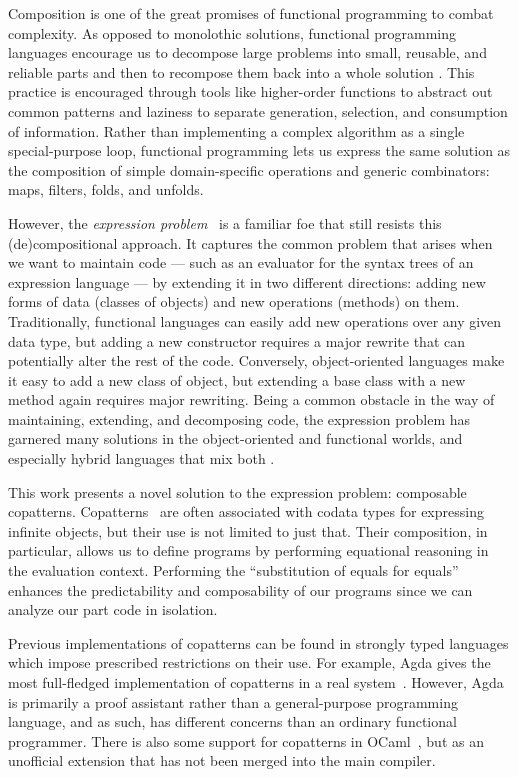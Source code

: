 
Composition is one of the great promises of functional programming to combat complexity.
As opposed to monolothic solutions, functional programming languages encourage us to decompose large problems into small, reusable, and reliable parts and then to recompose them back into a whole solution \cite{Hughes1989WFPM}.
This practice is encouraged through tools like higher-order functions to abstract out common patterns and laziness to separate generation, selection, and consumption of information.
Rather than implementing a complex algorithm as a single special-purpose loop, functional programming lets us express the same solution as the composition of simple domain-specific operations and generic combinators: maps, filters, folds, and unfolds.

However, the \emph{expression problem}~\cite{ExpressionProblem} is a familiar foe that still resists this (de)compositional approach.
It captures the common problem that arises when we want to maintain code --- such as an evaluator for the syntax trees of an expression language --- by extending it in two different directions: adding new forms of data (\ie classes of objects) and new operations (\ie methods) on them.
Traditionally, functional languages can easily add new operations over any given data type, but adding a new constructor requires a major rewrite that can potentially alter the rest of the code.
Conversely, object-oriented languages make it easy to add a new class of object, but extending a base class with a new method again requires major rewriting.
Being a common obstacle in the way of maintaining, extending, and decomposing code, the expression problem has garnered many solutions in the object-oriented \cite{GangOfFour,wehr_javagi_2011} and functional \cite{swierstra_data_2008,keep_nanopass_2013} worlds, and especially hybrid languages that mix both \cite{BrachaC90Mixins,flatt1998mixin}.

This work presents a novel solution to the expression problem: composable copatterns.
Copatterns~\cite{APTS2013C} are often associated with codata types for expressing infinite objects, but their use is not limited to just that.
Their composition, in particular, allows us to define programs by performing equational reasoning in the evaluation context.
Performing the ``substitution of equals for equals''~\cite{wadler_critique_1987} enhances the predictability and composability of our programs since we can analyze our part code in isolation.

Previous implementations of copatterns can be found in strongly typed languages which impose prescribed restrictions on their use.
For example, Agda gives the most full-fledged implementation of copatterns in a real system~\cite{ElaboratingDependentCopatterns}.
However, Agda is primarily a proof assistant rather than a general-purpose programming language, and as such, has different concerns than an ordinary functional programmer.
There is also some support for copatterns in OCaml~\cite{LaforgueR17}, but as an unofficial extension that has not been merged into the main compiler.

